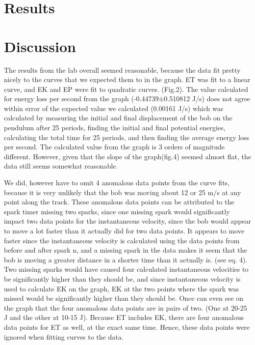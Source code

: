 \documentclass[letterpaper]{article}
\begin{document}
\section{Results}
  \lipsum[3]

\section{Discussion}
The results from the lab overall seemed reasonable, because the data fit pretty nicely to the curves that we expected them to in the graph. ET was fit to a linear curve, and EK and EP were fit to quadratic curves.  (Fig.2).  The value calculated for energy loss per second from the graph (-0.44739±0.510812 J/s) does not agree within error of the expected value we calculated (0.00161 J/s) which was calculated by measuring the initial and final displacement of the bob on the pendulum after 25 periods, finding the initial and final potential energies, calculating the total time for 25 periods, and then finding the average energy loss per second. The calculated value from the graph is 3 orders of magnitude different. However, given that the slope of the graph(fig.4) seemed almost flat, the data still seems somewhat reasonable.

We did, however have to omit 4 anomalous data points from the curve fits, because it is very unlikely that the bob was moving about 12 or 25 m/s at any point along the track. These anomalous data points can be attributed to the spark timer missing two sparks, since one missing spark would significantly impact two data points for the instantaneous velocity, since the bob would appear to move a lot faster than it actually did for two data points. It appears to move faster since the instantaneous velocity is calculated using the data points from before and after spark n, and a missing spark in the data makes it seem that the bob is moving a greater distance in a shorter time than it actually is. (see eq. 4). Two missing sparks would have caused four calculated instantaneous velocities to be significantly higher than they should be, and since instantaneous velocity is used to calculate EK on the graph, EK at the two points where the spark was missed would be significantly higher than they should be. Once can even see on the graph that the four anomalous data points are in pairs of two. (One at 20-25 J and the other at 10-15 J). Because ET includes EK, there are four anomalous data points for ET as well, at the exact same time.  Hence, these data points were ignored when fitting curves to the data.
\end{document}
